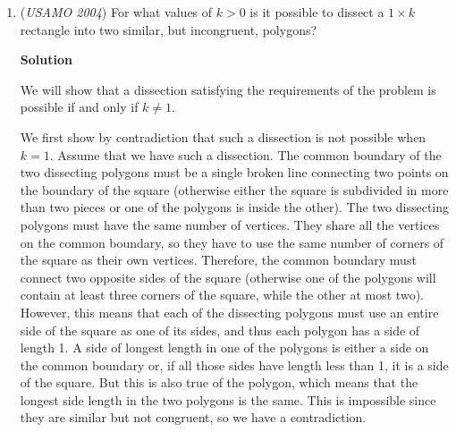 \begin{enumerate}
 \textbf{Proof:} Assume $a_i$ has at least two elements; $x$ and $y$. By (b), $x - y$ is in $S$, and by the application of (c) above, we get that $n(x - y)$ for integers $n$ is in $S$. Then apply (c) to $n(x - y)$ and $ny$ or $nx$ to get that $ax + by\in S$ for all $a,b\in \mathbb{Z}$.

 Now let the terms be $a_1,a_2,\ldots,a_{n}$. By applying our lemma many times, all numbers in  the form $\sum c_1a_1$ for a sequence of integers $c_i$ are attainable if the sequence is of a length which is a power of 2. If not, we "pad" the sequence with many copies of an existing element of the sequence until it does have a length which is a power of 2 - it is apparent that this will not change $S$.

 By Schur's theorem (a generalization of the more well-known Chicken McNugget theorem), every integer greater than some integer $n$ is attainable, and hence there are two members of $S$ in the form $\sum c_1a_1$ which are consecutive integers. Furthermore, because such numbers are closed under addition, their sum is in $S$, and hence so is their difference; $1$. Thus, by the argument at the beginning at this proof, $S$ is the set of all integers, as desired.

 \textbf{Resources} 


	\item (\textit{USAMO 2004}) For what values of $k > 0$ is it possible to dissect a $1 \times k$ rectangle into two similar, but incongruent, polygons?


 



\textbf{Solution}

We will show that a dissection satisfying the requirements of the problem is possible if and only if $k\neq 1$.

 We first show by contradiction that such a dissection is not possible when $k = 1$. Assume that we have such a dissection. The common boundary of the two dissecting polygons must be a single broken line connecting two points on the boundary of the square (otherwise either the square is subdivided in more than two pieces or one of the polygons is inside the other). The two dissecting polygons must have the same number of vertices. They share all the vertices on the common boundary, so they have to use the same number of corners of the square as their own vertices. Therefore, the common boundary must connect two opposite sides of the square (otherwise one of the polygons will contain at least three corners of the square, while the other at most two). However, this means that each of the dissecting polygons must use an entire side of the square as one of its sides, and thus each polygon has a side of length 1. A side of longest length in one of the polygons is either a side on the common boundary or, if all those sides have length less than 1, it is a side of the square. But this is also true of the polygon, which means that the longest side length in the two polygons is the same. This is impossible since they are similar but not congruent, so we have a contradiction.


\end{enumerate}
